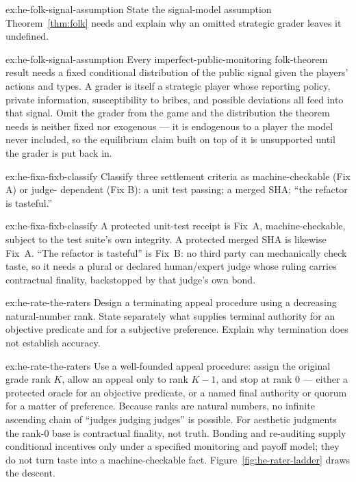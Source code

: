 \documentclass[11pt,a4paper]{article}
\theoremstyle{definition}
\theoremstyle{definition}
\theoremstyle{remark}
\begin{document}
\begin{pdexercise}[kind=Check,rating=1]{ex:he-folk-signal-assumption}
State the signal-model assumption Theorem~\ref{thm:folk} needs and explain
  why an omitted strategic grader leaves it undefined.
\end{pdexercise}
\begin{pdsolution}{ex:he-folk-signal-assumption}
Every imperfect-public-monitoring folk-theorem result needs a fixed
conditional distribution of the public signal given the players' actions and
types. A grader is itself a strategic player whose reporting policy, private
information, susceptibility to bribes, and possible deviations all feed into
that signal. Omit the grader from the game and the distribution the theorem
needs is neither fixed nor exogenous --- it is endogenous to a player the model
never included, so the equilibrium claim built on top of it is unsupported until
the grader is put back in.
\end{pdsolution}
\begin{pdexercise}[kind=Check,rating=1]{ex:he-fixa-fixb-classify}
Classify three settlement criteria as machine-checkable (Fix A) or judge-
  dependent (Fix B): a unit test passing; a merged SHA; ``the refactor is
  tasteful.''
\end{pdexercise}
\begin{pdsolution}{ex:he-fixa-fixb-classify}
A protected unit-test receipt is Fix~A, machine-checkable, subject to the
test suite's own integrity. A protected merged SHA is likewise Fix~A. ``The
refactor is tasteful'' is Fix~B: no third party can mechanically check taste, so
it needs a plural or declared human/expert judge whose ruling carries
contractual finality, backstopped by that judge's own bond.
\end{pdsolution}
\begin{pdexercise}[kind=Open,rating=3]{ex:he-rate-the-raters}
Design a terminating appeal procedure using a decreasing natural-number
rank. State separately what supplies terminal authority for an objective
predicate and for a subjective preference. Explain why termination does
not establish accuracy.
\end{pdexercise}
\begin{pdsolution}{ex:he-rate-the-raters}
Use a well-founded appeal procedure: assign the original grade rank $K$, allow an appeal only to rank
$K{-}1$, and stop at rank $0$ --- either a protected oracle for an objective
predicate, or a named final authority or quorum for a matter of preference.
Because ranks are natural numbers, no infinite ascending chain of ``judges
judging judges'' is possible. For aesthetic judgments the rank-$0$ base is
contractual finality, not truth. Bonding and re-auditing supply conditional
incentives only under a specified monitoring and payoff model; they do not
turn taste into a machine-checkable fact. Figure~\ref{fig:he-rater-ladder} draws the descent.


\end{pdsolution}
\end{document}
